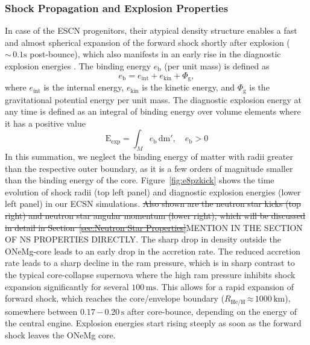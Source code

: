 \documentclass[fleqn,usenatbib]{mnras}
\renewcommand{\sec}{\xspace\ensuremath{\text{s}}}
\newcommand{\NY}[2]{{\color{blue}\sout{#1}#2}}
\begin{document}
\subsubsection{Shock Propagation and Explosion Properties}
\label{sec:explosion ecsn}
In case of the ESCN progenitors, their atypical density structure enables a fast and almost spherical expansion of the forward shock shortly after explosion ($\mathord{\sim}\, 0.1 \sec$ post-bounce), which also manifests in an early rise in the diagnostic explosion energies \citep{Kitaura2006,Janka2008,Gessner2018}.
The binding energy $e_{\text{b}}$ (per unit mass) is defined as
\begin{equation}
    e_{\text{b}} = e_{\mathrm{int}} + e_{\mathrm{kin}} + \Phi_{\text{g}},
\end{equation}
where $e_{\mathrm{int}}$ is the internal energy, $e_{\mathrm{kin}}$ is the kinetic energy, and $\Phi_{\text{g}}$ is the gravitational potential energy per unit mass.
The diagnostic explosion energy at any time is defined as an integral of binding energy over volume elements where it has a positive value 
\begin{equation}
    \mathrm{E}_{\mathrm{exp}} = \int_{M} e_{\mathrm{b}} \, \mathrm{dm'},\quad e_{\mathrm{b}} > 0
    \label{equ:ene exp}
\end{equation}
In this summation, we neglect the binding energy of matter with radii greater than the respective outer boundary, as it is a few orders of magnitude smaller than the binding energy of the core. Figure~\ref{fig:e8pzkick} shows the time evolution of shock radii (top left panel) and diagnostic explosion energies (lower left panel) in our ECSN simulations. \NY{Also shown are the neutron star kicks (top right) and neutron star angular momentum (lower right), which will be discussed in detail in Section~\ref{sec:Neutron Star Properties}}{MENTION IN THE SECTION OF NS PROPERTIES DIRECTLY}. The sharp drop in density outside the ONeMg-core leads to an early drop in the accretion rate. The reduced accretion rate leads to a sharp decline in the ram pressure, which is in sharp contrast to the typical core-collapse supernova where the high ram pressure inhibits shock expansion significantly for several $100\,\text{ms}$. This allows for a rapid expansion of forward shock, which reaches the core/envelope boundary ($R_{\mathrm{He/H}}\,\mathord{\approx}\,1000\,\text{km}$), somewhere between $0.17\,\mathord{-}\,0.20\,\sec$ after core-bounce, depending on the energy of the central engine. Explosion energies start rising steeply as soon as the forward shock leaves the ONeMg core.
\end{document}
